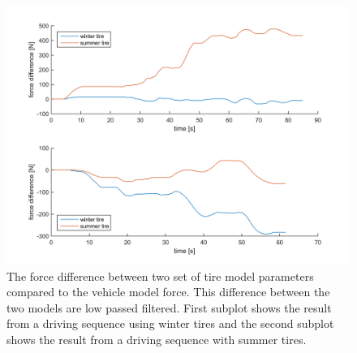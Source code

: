 \begin{figure}[h]
	\centering
	\includegraphics[width=1.0\textwidth]{Pictures/force_difference}
	\caption {The force difference between two set of tire model parameters compared to the vehicle model force. This difference between the two models are low passed filtered. First subplot shows the result from a driving sequence using winter tires and the second subplot shows the result from a driving sequence with summer tires.}
	\label{force_difference}
\end{figure}

